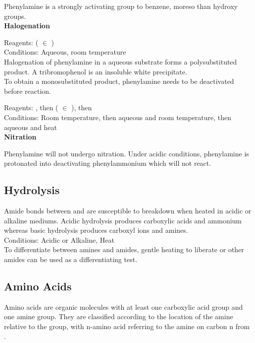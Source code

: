 \documentclass[../main]{subfiles}
\begin{document}
	Phenylamine is a strongly activating group to benzene, moreso than hydroxy groups. \\

	\noindent \textbf{Halogenation}

	Reagents:  ( \(\in\) ) \\
	Conditions:  Aqueous, room temperature\\

	Halogenation of phenylamine in a aqueous substrate forms a polysubstituted product. A tribromophenol is an insoluble white precipitate. \\

	To obtain a monosubstituted product, phenylamine needs to be deactivated before reaction.

	Reagents: , then  ( \(\in\) ), then  \\
	Conditions: Room temperature, then aqueous and room temperature, then aqueous and heat \\

	\noindent \textbf{Nitration}

	Phenylamine will not undergo nitration. Under acidic conditions, phenylamine is protonated into deactivating phenylammonium which will not react.

	\subsection{Hydrolysis}

	Amide bonds between  and  are susceptible to breakdown when heated in acidic or alkaline mediums. Acidic hydrolysis produces carboxylic acids and ammonium whereas basic hydrolysis produces carboxyl ions and amines. \\

	Conditions: Acidic or Alkaline, Heat \\

	To differentiate between amines and amides, gentle heating to liberate  or other amides can be used as a differentiating test. \\

	\subsection{Amino Acids}

	Amino acids are organic molecules with at least one carboxylic acid group and one amine group. They are classified according to the location of the amine relative to the  group, with n-amino acid referring to the amine on carbon n from .\\
\end{document}
